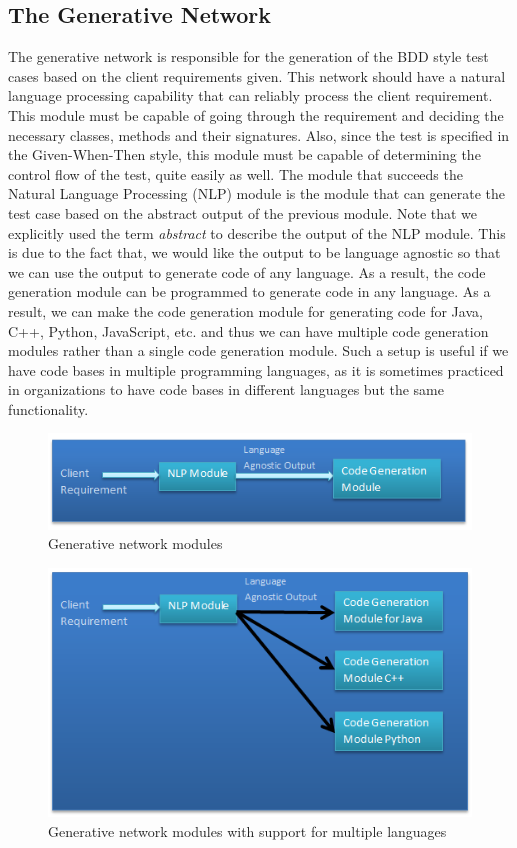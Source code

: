 \documentclass[conference]{IEEEtran}
\begin{document}
\subsection{The Generative Network}
The generative network is responsible for the generation of the BDD style test cases based on the client requirements given. This network should have a natural language processing capability that can reliably process the client requirement. This module must be capable of going through the requirement and deciding the necessary classes, methods and their signatures. Also, since the test is specified in the Given-When-Then style, this module must be capable of determining the control flow of the test, quite easily as well.\newline
The module that succeeds the Natural Language Processing (NLP) module is the module that can generate the test case based on the abstract output of the previous module. Note that we explicitly used the term \textit{abstract} to describe the output of the NLP module. This is due to the fact that, we would like the output to be language agnostic so that we can use the output to generate code of any language. As a result, the code generation module can be programmed to generate code in any language. As a result, we can make the code generation module for generating code for Java, C++, Python, JavaScript, etc. and thus we can have multiple code generation modules rather than a single code generation module. Such a setup is useful if we have code bases in multiple programming languages, as it is sometimes practiced in organizations to have code bases in different languages but the same functionality.

\begin{figure}
	\includegraphics[width=\linewidth]{Gen_net_modules.png}
	\caption{Generative network modules}
	\label{fig6}
\end{figure} 

\begin{figure}
	\includegraphics[width=\linewidth]{Gen_net_modules_multiple.png}
	\caption{Generative network modules with support for multiple languages}
	\label{fig7}
\end{figure} 
\end{document}
